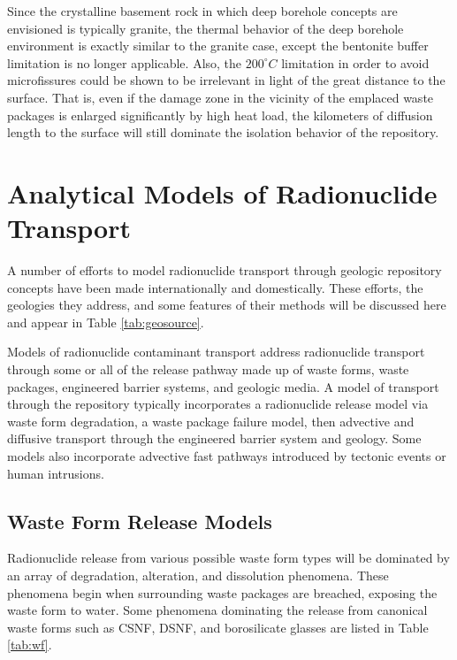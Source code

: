 Since the crystalline basement rock in which deep borehole concepts are 
envisioned is typically granite, the thermal behavior of the deep borehole 
environment is exactly similar to the granite case, except the bentonite buffer 
limitation is no longer applicable.  Also, the $200^{\circ}C$ limitation in 
order to avoid microfissures could  be shown to be irrelevant in light of the 
great distance to the surface. That is, even if the damage zone in the vicinity 
of the emplaced waste packages is enlarged significantly by high heat load, 
the kilometers of diffusion length to the surface will still dominate the 
isolation behavior of the repository. 



\section{Analytical Models of Radionuclide Transport} \label{sec:analytical_nuc}


A number of efforts to model radionuclide transport through geologic repository 
concepts have been made internationally and domestically. These efforts, the 
geologies they address, and  some features of their methods will be 
discussed here and appear in Table \ref{tab:geosource}.



Models of radionuclide contaminant transport address radionuclide transport 
through some or all of the release pathway made up of waste forms, waste packages, 
engineered barrier systems, and geologic media. A model of transport through 
the repository typically incorporates a radionuclide release model via waste 
form degradation, a waste package failure model, then advective and diffusive 
transport through the engineered barrier system and geology. Some models also 
incorporate advective fast pathways introduced by tectonic events or human 
intrusions.

\subsection{Waste Form Release Models}

Radionuclide release from various possible waste form types will be dominated by an 
array of degradation, alteration, and dissolution phenomena. These phenomena 
begin when surrounding waste packages are breached, exposing the waste form to 
water. Some phenomena dominating the release from canonical waste forms such as  
\gls{CSNF}, \gls{DSNF}, and borosilicate glasses are listed in Table \ref{tab:wf}.

